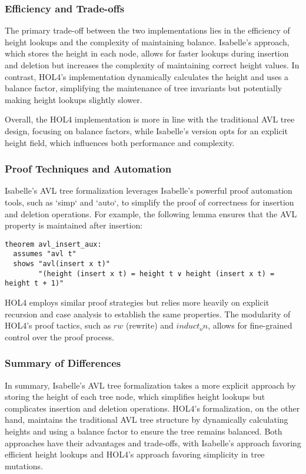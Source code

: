 \documentclass[12pt]{article}
\begin{document}
\subsubsection{Efficiency and Trade-offs}

The primary trade-off between the two implementations lies in the efficiency of height lookups and the complexity of maintaining balance. Isabelle's approach, which stores the height in each node, allows for faster lookups during insertion and deletion but increases the complexity of maintaining correct height values. In contrast, HOL4’s implementation dynamically calculates the height and uses a balance factor, simplifying the maintenance of tree invariants but potentially making height lookups slightly slower.

Overall, the HOL4 implementation is more in line with the traditional AVL tree design, focusing on balance factors, while Isabelle’s version opts for an explicit height field, which influences both performance and complexity.

\subsubsection{Proof Techniques and Automation}
Isabelle’s AVL tree formalization leverages Isabelle’s powerful proof automation tools, such as `simp` and `auto`, to simplify the proof of correctness for insertion and deletion operations. For example, the following lemma ensures that the AVL property is maintained after insertion:

\begin{verbatim}
theorem avl_insert_aux:
  assumes "avl t"
  shows "avl(insert x t)"
        "(height (insert x t) = height t ∨ height (insert x t) = height t + 1)"
\end{verbatim}

HOL4 employs similar proof strategies but relies more heavily on explicit recursion and case analysis to establish the same properties. The modularity of HOL4’s proof tactics, such as \(rw\) (rewrite) and \(induct_on\), allows for fine-grained control over the proof process.

\subsubsection{Summary of Differences}
In summary, Isabelle’s AVL tree formalization takes a more explicit approach by storing the height of each tree node, which simplifies height lookups but complicates insertion and deletion operations. HOL4’s formalization, on the other hand, maintains the traditional AVL tree structure by dynamically calculating heights and using a balance factor to ensure the tree remains balanced. Both approaches have their advantages and trade-offs, with Isabelle’s approach favoring efficient height lookups and HOL4’s approach favoring simplicity in tree mutations.
\end{document}
